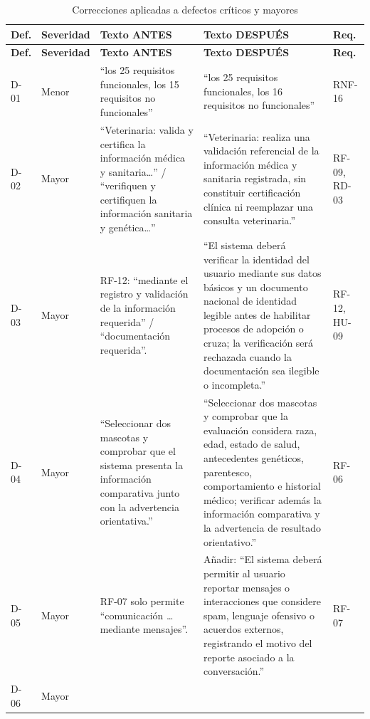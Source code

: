 \documentclass[journal,onecolumn]{IEEEtran}
\begin{document}
	\begin{longtable}{C{1.2cm} L{1.7cm} L{4.5cm} L{4.5cm} L{1.5cm}}
		\caption{Correcciones aplicadas a defectos críticos y mayores}\label{tab:correcciones}\\
		\toprule
		\textbf{Def.} & \textbf{Severidad} & \textbf{Texto ANTES} & \textbf{Texto DESPUÉS} &
		\textbf{Req.} \\
		\midrule
		\endfirsthead
		\toprule
		\textbf{Def.} & \textbf{Severidad} & \textbf{Texto ANTES} & \textbf{Texto DESPUÉS} &
		\textbf{Req.} \\
		\midrule
		\endhead
		\bottomrule
		\endfoot
		D-01 & Menor &
		``los 25 requisitos funcionales, los 15 requisitos no funcionales'' &
		``los 25 requisitos funcionales, los 16 requisitos no funcionales'' & RNF-16 \\
		\addlinespace
		D-02 & Mayor &
		``Veterinaria: valida y certifica la información médica y sanitaria\ldots'' /
		``verifiquen y certifiquen la información sanitaria y genética\ldots'' &
		``Veterinaria: realiza una validación referencial de la información médica y sanitaria
		registrada, sin constituir certificación clínica ni reemplazar una consulta veterinaria.'' &
		RF-09, RD-03 \\
		\addlinespace
		D-03 & Mayor &
		RF-12: ``mediante el registro y validación de la información requerida'' /
		``documentación requerida''. &
		``El sistema deberá verificar la identidad del usuario mediante sus datos básicos y un
		documento nacional de identidad legible antes de habilitar procesos de adopción o cruza; la
		verificación será rechazada cuando la documentación sea ilegible o incompleta.'' &
		RF-12, HU-09 \\
		\addlinespace
		D-04 & Mayor &
		``Seleccionar dos mascotas y comprobar que el sistema presenta la información comparativa
		junto con la advertencia orientativa.'' &
		``Seleccionar dos mascotas y comprobar que la evaluación considera raza, edad, estado de
		salud, antecedentes genéticos, parentesco, comportamiento e historial médico; verificar además
		la información comparativa y la advertencia de resultado orientativo.'' & RF-06 \\
		\addlinespace
		D-05 & Mayor &
		RF-07 solo permite ``comunicación \ldots mediante mensajes''. &
		Añadir: ``El sistema deberá permitir al usuario reportar mensajes o interacciones que
		considere spam, lenguaje ofensivo o acuerdos externos, registrando el motivo del reporte
		asociado a la conversación.'' & RF-07 \\
		\addlinespace
		D-06 & Mayor &

\end{longtable}
\end{document}
